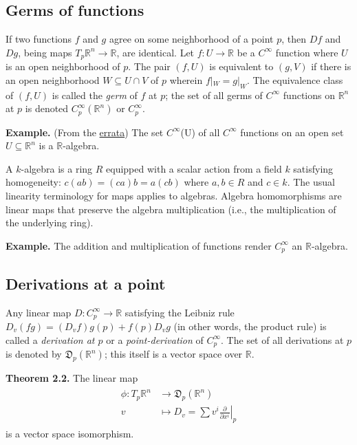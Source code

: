\documentclass[a4paper]{article}
\newcommand{\R}{\mathbb{R}}
\begin{document}
\subsection{Germs of functions}

If two functions $f$ and $g$ agree on some neighborhood of a point $p$, then $Df$ and $Dg$, being maps $T_p\R^n \to \R$, are identical. Let $f : U \to \R$ be a $C^\infty$ function where $U$ is an open neighborhood of $p$. The pair $(f, U)$ is equivalent to $(g, V)$ if there is an open neighborhood $W \subseteq U \cap V$ of $p$ wherein $f|_W = g|_W$. The equivalence class of $(f, U)$ is called the \emph{germ} of $f$ at $p$; the set of all germs of $C^\infty$ functions on $\R^n$ at $p$ is denoted $C_p^\infty(\R^n)$ or $C_p^\infty$.

\textbf{Example.} (From the \href{https://ltu.pages.tufts.edu/doc/mf2_master_errata2.pdf}{errata}) The set $C^\infty$(U) of all $C^\infty$ functions on an open set $U \subseteq \R^n$ is a $\R$-algebra.

A $k$-algebra is a ring $R$ equipped with a scalar action from a field $k$ satisfying homogeneity: $c(ab) = (ca)b = a(cb)$ where $a, b \in R$ and $c \in k$. The usual linearity terminology for maps applies to algebras. Algebra homomorphisms are linear maps that preserve the algebra multiplication (i.e., the multiplication of the underlying ring).

\textbf{Example.} The addition and multiplication of functions render $C_p^\infty$ an $\R$-algebra.

\subsection{Derivations at a point}

Any linear map $D : C_p^\infty \to \R$ satisfying the Leibniz rule $D_v(fg) = (D_vf)g(p) + f(p)D_vg$ (in other words, the product rule) is called a \emph{derivation at $p$} or a \emph{point-derivation} of $C_p^\infty$. The set of all derivations at $p$ is denoted by $\mathfrak{D}_p(\R^n)$; this itself is a vector space over $\R$.

\textbf{Theorem 2.2.} The linear map
\begin{align}
\begin{split}
    \phi : T_p\R^n &\to \mathfrak{D}_p(\R^n) \\
    v &\mapsto D_v = \sum v^i \left.\frac{\partial}{\partial x^i}\right|_p
\end{split}
\end{align}
is a vector space isomorphism.
\end{document}
